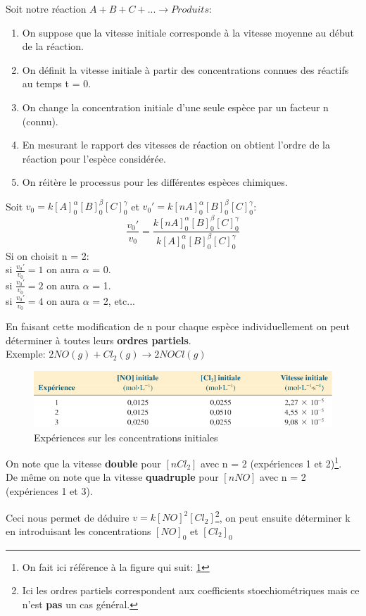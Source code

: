 \documentclass[10pt,a4paper]{book}
\begin{document}
Soit notre réaction \(A + B + C + ... \rightarrow Produits\):
\begin{enumerate}
\item On suppose que la vitesse initiale corresponde à la vitesse moyenne au début de la réaction.
\item On définit la vitesse initiale à partir des concentrations connues des réactifs au temps t = 0.
\item On change la concentration initiale d’une seule espèce par un facteur n (connu).
\item En mesurant le rapport des vitesses de réaction on obtient l’ordre de la réaction pour l’espèce considérée.
\item On réitère le processus pour les différentes espèces chimiques.
\end{enumerate}
Soit \(v_0 = k[A]^{\alpha}_0[B]^{\beta}_0[C]^{\gamma}_0\) et \(v_0' = k[nA]^{\alpha}_0[B]^{\beta}_0[C]^{\gamma}_0\):
\[\frac{v_0'}{v_0} = \frac{k[nA]^{\alpha}_0[B]^{\beta}_0[C]^{\gamma}_0}{k[A]^{\alpha}_0[B]^{\beta}_0[C]^{\gamma}_0}\]
Si on choisit n = 2: \\
si \(\frac{v_0'}{v_0} = 1\) on aura $\alpha$ = 0. \\
si \(\frac{v_0'}{v_0} = 2\) on aura $\alpha$ = 1. \\
si \(\frac{v_0'}{v_0} = 4\) on aura $\alpha$ = 2, etc... \par
En faisant cette modification de n pour chaque espèce individuellement on peut déterminer à toutes leurs \textbf{ordres partiels}.
\\
Exemple: \(2NO(g) + Cl_2(g) \longrightarrow 2NOCl(g)\) \\
\begin{figure}[h!]
\begin{center}
\includegraphics[scale=0.75]{./assets/method_vitesse_exemple.png}
\caption{Expériences sur les concentrations initiales}
\label{fig:speed_method_example}
\end{center}
\end{figure}
On note que la vitesse \textbf{double} pour \([nCl_2]\) avec n = 2 (expériences 1 et 2)\footnote{On fait ici référence à la figure qui suit: \ref{fig:speed_method_example}}. \\
De même on note que la vitesse \textbf{quadruple} pour \([nNO]\) avec n = 2 (expériences 1 et 3). \par
Ceci nous permet de déduire \(v = k[NO]^2[Cl_2]\)\;\;\footnote{Ici les ordres partiels correspondent aux coefficients stoechiométriques mais ce n'est \textbf{pas} un cas général.}, on peut ensuite déterminer k en introduisant les concentrations $[NO]_0$ et $[Cl_2]_0$ 
\end{document}
